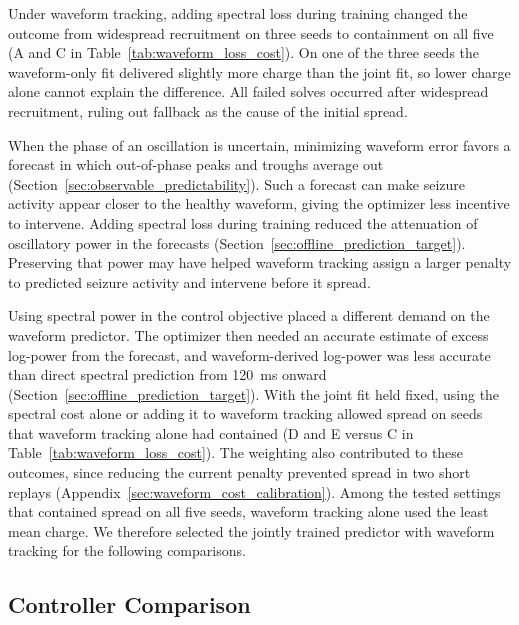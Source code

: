 Under waveform tracking, adding spectral loss during training changed the outcome from widespread recruitment on three seeds to containment on all five (A and C in Table~\ref{tab:waveform_loss_cost}).
On one of the three seeds the waveform-only fit delivered slightly more charge than the joint fit, so lower charge alone cannot explain the difference.
All failed solves occurred after widespread recruitment, ruling out fallback as the cause of the initial spread.

When the phase of an oscillation is uncertain, minimizing waveform error favors a forecast in which out-of-phase peaks and troughs average out (Section~\ref{sec:observable_predictability}).
Such a forecast can make seizure activity appear closer to the healthy waveform, giving the optimizer less incentive to intervene.
Adding spectral loss during training reduced the attenuation of oscillatory power in the forecasts (Section~\ref{sec:offline_prediction_target}).
Preserving that power may have helped waveform tracking assign a larger penalty to predicted seizure activity and intervene before it spread.

Using spectral power in the control objective placed a different demand on the waveform predictor.
The optimizer then needed an accurate estimate of excess log-power from the forecast, and waveform-derived log-power was less accurate than direct spectral prediction from \SI{120}{\milli\second} onward (Section~\ref{sec:offline_prediction_target}).
With the joint fit held fixed, using the spectral cost alone or adding it to waveform tracking allowed spread on seeds that waveform tracking alone had contained (D and E versus C in Table~\ref{tab:waveform_loss_cost}).
The weighting also contributed to these outcomes, since reducing the current penalty prevented spread in two short replays (Appendix~\ref{sec:waveform_cost_calibration}). %
Among the tested settings that contained spread on all five seeds, waveform tracking alone used the least mean charge.
We therefore selected the jointly trained predictor with waveform tracking for the following comparisons.

\FloatBarrier
\subsection{Controller Comparison}\label{sec:controller_comparison}

